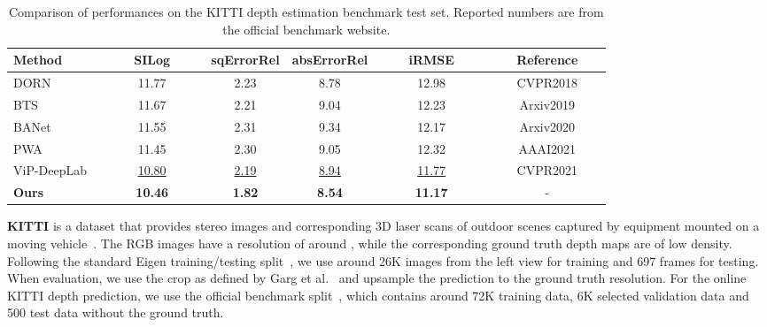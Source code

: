 \documentclass[twocolumn]{svjour3}    \pdfoutput=1
\begin{document}
\begin{table*}[t]
    \centering
    \begin{adjustbox}{width=0.875\textwidth,center}
        \begin{tabular}{@{}lccccc@{}}
            \toprule
            Method  & ~~~~SILog~~~~ & sqErrorRel & absErrorRel  & ~~~~iRMSE~~~~ & ~~~Reference~~~ \\ \midrule
            DORN~\citep{fu2018deep} & 11.77  & 2.23 & 8.78 & 12.98 & CVPR2018\\
            BTS~\citep{lee2019bts}  & 11.67  & 2.21 & 9.04 & 12.23 & Arxiv2019    \\
            BANet~\citep{aich2020BANet} & 11.55  & 2.31 & 9.34 & 12.17  &   Arxiv2020\\
            PWA~\citep{lee2021PWA} & 11.45  & 2.30 & 9.05 & 12.32  &  AAAI2021   \\
            ViP-DeepLab~\citep{qiao2021vip} & \underline{10.80} & \underline{2.19} & \underline{8.94} & \underline{11.77}  & CVPR2021 \\ 
            \midrule
            \textbf{Ours}  & \textbf{10.46}  & \textbf{1.82} & \textbf{8.54} & \textbf{11.17} & - \\
            \bottomrule
        \end{tabular}
    \end{adjustbox}
    \vspace{-0.1cm}
    \caption{Comparison of performances on the KITTI depth estimation benchmark test set. Reported numbers are from the official benchmark website.}
    \vspace{-0.3cm}
\label{tab:results-kitti-test}
\vspace{-0.2cm}
\end{table*} 

\textbf{KITTI} is a dataset that provides stereo images and corresponding
3D laser scans of outdoor scenes captured by equipment mounted on a moving vehicle~\citep{geiger2013kitti}. The RGB images have a resolution of around , while the corresponding ground truth depth maps are of low density. Following the standard Eigen training/testing split~\citep{eigen2014depth}, we use around 26K images from the left view for training and 697 frames for testing. When evaluation, we use the crop as defined by Garg et al.~\citep{garg2016unsupervised} and upsample the prediction to the ground truth resolution. For the online KITTI depth prediction, we use the official benchmark split~\citep{uhrig2017sparsity}, which contains around 72K training data, 6K selected validation data and 500 test data without the ground truth. 
\end{document}
